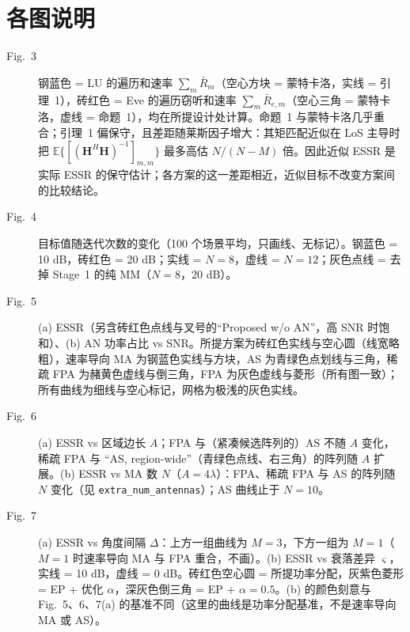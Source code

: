 \documentclass[11pt,a4paper]{ctexart}
\newcommand{\code}[1]{\texttt{#1}}
\newcommand{\E}{\mathbb{E}}
\newcommand{\bH}{\mathbf H}
\begin{document}
\section{各图说明}
\begin{description}
\item[Fig.~3] 钢蓝色 = LU 的遍历和速率 $\sum_m\bar R_m$（空心方块 = 蒙特卡洛，实线 = 引理~1），砖红色 = Eve 的遍历窃听和速率 $\sum_m\bar R_{e,m}$（空心三角 = 蒙特卡洛，虚线 = 命题~1），均在所提设计处计算。命题~1 与蒙特卡洛几乎重合；引理~1 偏保守，且差距随莱斯因子增大：其矩匹配近似在 LoS 主导时把 $\E\{[(\bH^H\bH)^{-1}]_{m,m}\}$ 最多高估 $N/(N-M)$ 倍。因此近似 ESSR 是实际 ESSR 的保守估计；各方案的这一差距相近，近似目标不改变方案间的比较结论。
\item[Fig.~4] 目标值随迭代次数的变化（100 个场景平均，只画线、无标记）。钢蓝色 = 10 dB，砖红色 = 20 dB；实线 = $N=8$，虚线 = $N=12$；灰色点线 = 去掉 Stage~1 的纯 MM（$N=8$，20 dB）。
\item[Fig.~5] (a) ESSR（另含砖红色点线与叉号的“Proposed w/o AN”，高 SNR 时饱和）、(b) AN 功率占比 vs SNR。所提方案为砖红色实线与空心圆（线宽略粗），速率导向 MA 为钢蓝色实线与方块，AS 为青绿色点划线与三角，稀疏 FPA 为赭黄色虚线与倒三角，FPA 为灰色虚线与菱形（所有图一致）；所有曲线为细线与空心标记，网格为极浅的灰色实线。
\item[Fig.~6] (a) ESSR vs 区域边长 $A$；FPA 与（紧凑候选阵列的）AS 不随 $A$ 变化，稀疏 FPA 与 “AS, region-wide”（青绿色点线、右三角）的阵列随 $A$ 扩展。(b) ESSR vs MA 数 $N$（$A=4\lambda$）：FPA、稀疏 FPA 与 AS 的阵列随 $N$ 变化（见 \code{extra\_num\_antennas}）；AS 曲线止于 $N=10$。
\item[Fig.~7] (a) ESSR vs 角度间隔 $\Delta$：上方一组曲线为 $M=3$，下方一组为 $M=1$（$M=1$ 时速率导向 MA 与 FPA 重合，不画）。(b) ESSR vs 衰落差异 $\varsigma$，实线 = 10 dB，虚线 = 0 dB。砖红色空心圆 = 所提功率分配，灰紫色菱形 = EP + 优化 $\alpha$，深灰色倒三角 = EP + $\alpha=0.5$。(b) 的颜色刻意与 Fig.~5、6、7(a) 的基准不同（这里的曲线是功率分配基准，不是速率导向 MA 或 AS）。
\end{description}

\end{document}
